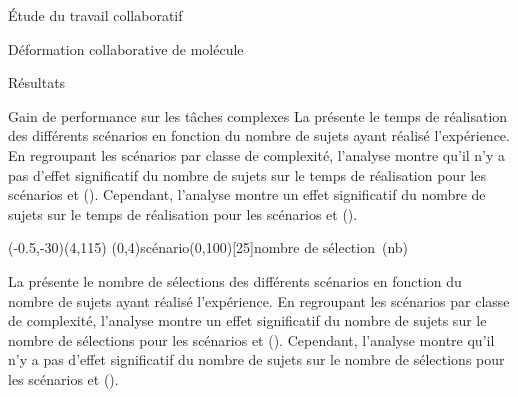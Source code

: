 \documentclass[myfrancais]{mythesis}
\begin{document}
\begin{mypart}{Étude du travail collaboratif}
\begin{mychapter}{Déformation collaborative de molécule}
\begin{mysection}{Résultats}
\begin{mysubsection}{Gain de performance sur les tâches complexes}
					La  présente le temps de réalisation  des différents scénarios  en fonction du nombre de sujets  ayant réalisé l'expérience.
					En regroupant les scénarios par classe de complexité, l'analyse montre qu'il n'y a pas d'effet significatif du nombre de sujets  sur le temps de réalisation  pour les scénarios  et  ().
					Cependant, l'analyse montre un effet significatif du nombre de sujets  sur le temps de réalisation  pour les scénarios  et  ().

					\begin{myfigure}
						\begin{myps}(-0.5,-30)(4,115)
							\myaxes(0,4){scénario}(0,100)[25]{nombre de sélection~(nb)}
						\end{myps}
					\end{myfigure}

					La  présente le nombre de sélections  des différents scénarios  en fonction du nombre de sujets  ayant réalisé l'expérience.
					En regroupant les scénarios par classe de complexité, l'analyse montre un effet significatif du nombre de sujets  sur le nombre de sélections  pour les scénarios  et  ().
					Cependant, l'analyse montre qu'il n'y a pas d'effet significatif du nombre de sujets  sur le nombre de sélections  pour les scénarios  et  ().


\end{mysubsection}
\end{mysection}
\end{mychapter}
\end{mypart}
\end{document}
